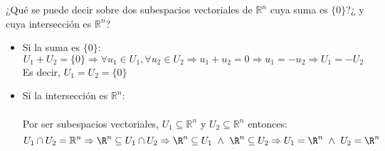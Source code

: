 \begin{ejercicio}¿Qué se puede decir sobre dos subespacios vectoriales de \( \mathbb{R}^n \) cuya suma es \( \{0\} \)?¿ y cuya intersección es \( \mathbb{R}^n \)?
	\begin{itemize}
		\item Si la suma es \( \{0\} \):
		      \begin{equation*}
			      U_1 + U_2 = \{0\} \Rightarrow \forall u_1 \in U_1, \forall u_2 \in U_2 \Rightarrow u_1 + u_2 = 0 \Rightarrow u_1 = -u_2 \Rightarrow U_1 = -U_2
		      \end{equation*}
		      Es decir, $U_1 = U_2 = \{0\}$
		\item Si la intersección es \( \mathbb{R}^n \):
		      \\ \\
		      Por ser subespacios vectoriales, $U_1 \subseteq \mathbb{R}^n$ y $U_2 \subseteq \mathbb{R}^n$ entonces:
		      \begin{equation*}
			      U_1 \cap U_2 = \mathbb{R}^n \Rightarrow \R^n \subseteq U_1 \cap U_2 \Rightarrow \R^n \subseteq U_1  \ \land \ \R^n \subseteq U_2 \Rightarrow U_1 = \R^n \ \land \ U_2 = \R^n
		      \end{equation*}
	\end{itemize}
\end{ejercicio}


